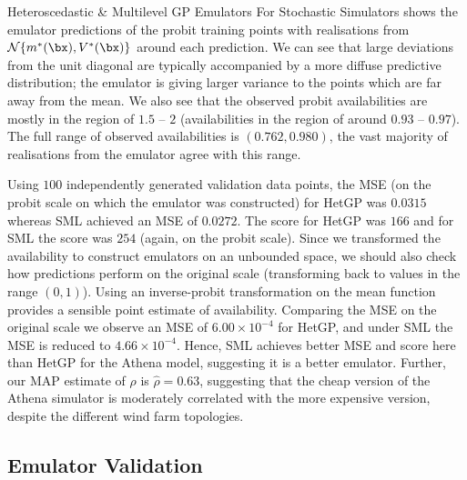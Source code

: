 \begin{chapter}{Heteroscedastic \& Multilevel GP Emulators For Stochastic Simulators\label{Ch:Hetsml}}
 shows the emulator predictions of the probit training points with realisations from $\mathcal{N}\{m^*(\bx), V^*(\bx)\}$ around each prediction. We can see that large deviations from the unit diagonal are typically accompanied by a more diffuse predictive distribution; the emulator is giving larger variance to the points which are far away from the mean. We also see that the observed probit availabilities are mostly in the region of $1.5$ -- $2$ (availabilities in the region of around $0.93$ -- $0.97$). The full range of observed availabilities is $(0.762, 0.980)$, the vast majority of realisations from the emulator agree with this range.

Using $100$ independently generated validation data points, the MSE (on the probit scale on which the emulator was constructed) for HetGP was $0.0315$ whereas SML achieved an MSE of $0.0272$. The score for HetGP was $166$ and for SML the score was $254$ (again, on the probit scale). Since we transformed the availability to construct emulators on an unbounded space, we should also check how predictions perform on the original scale (transforming back to values in the range $(0,1)$). Using an inverse-probit transformation on the mean function provides a sensible point estimate of availability. Comparing the MSE on the original scale  we observe an MSE of $6.00\times 10^{-4}$ for HetGP, and under SML the MSE is reduced to $4.66\times 10^{-4}$. Hence, SML achieves better MSE and score here than HetGP for the Athena model, suggesting it is a better emulator. Further, our MAP estimate of $\rho$ is $\hat{\rho} = 0.63$, suggesting that the cheap version of the Athena simulator is moderately correlated with the more expensive version, despite the different wind farm topologies.%

\subsection{Emulator Validation}


\end{chapter}
